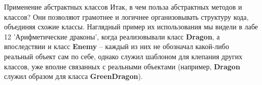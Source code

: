 \begin{lecture}[\lectureSubject]
\begin{lecSection}
\begin{lecSection}
			\begin{lecSubsection}{Применение абстрактных классов}
				Итак, в чем польза абстрактных методов и классов? Они позволяют грамотнее и логичнее организовывать структуру кода, объединяя схожие классы. Наглядный пример их использования мы видели в лабе 12 'Арифметические драконы', когда реализовывали класс \textbf{Dragon}, а впоследствии и класс \textbf{Enemy} -- каждый из них не обозначал какой-либо реальный объект сам по себе, однако служил шаблоном для клепания других классов, уже вполне связанных с реальными объектами (например, \textbf{Dragon} служил образом для класса \textbf{GreenDragon}).
			\end{lecSubsection}
		\end{lecSection}
	\end{lecSection}
\end{lecture}
